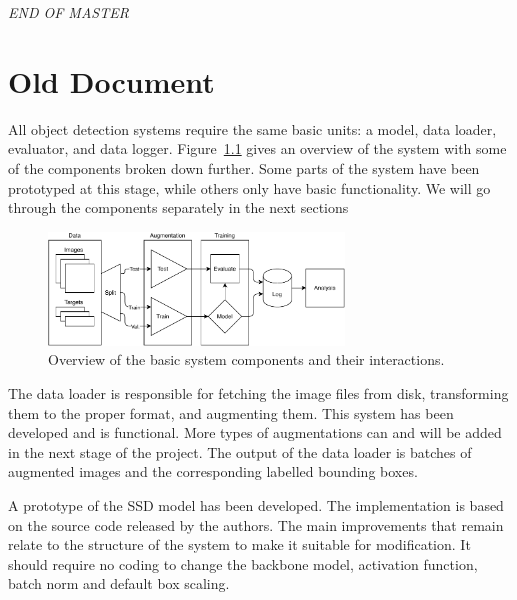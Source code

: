 \vspace*{\fill}
\begin{center}
    \textit{END OF MASTER}\thispagestyle{empty}
\end{center}
\vspace*{\fill}
%

\chapter{Old Document}


All object detection systems require the same basic units: a model, data loader, evaluator, and data logger.
Figure~\ref{fig:sys} gives an overview of the system with some of the components broken down further.
Some parts of the system have been prototyped at this stage, while others only have basic functionality.
We will go through the components separately in the next sections

\begin{figure}[htb]
  \centering
  \includegraphics[width=0.7\textwidth]{figs/system.pdf}
  \caption[System overview]{Overview of the basic system components and their interactions.}\label{fig:sys}
\end{figure}

The data loader is responsible for fetching the image files from disk, transforming them to the proper format, and augmenting them.
This system has been developed and is functional.
More types of augmentations can and will be added in the next stage of the project.
The output of the data loader is batches of augmented images and the corresponding labelled bounding boxes.

A prototype of the SSD model has been developed.
The implementation is based on the source code released by the authors.
The main improvements that remain relate to the structure of the system to make it suitable for modification.
It should require no coding to change the backbone model, activation function, batch norm and default box scaling.

